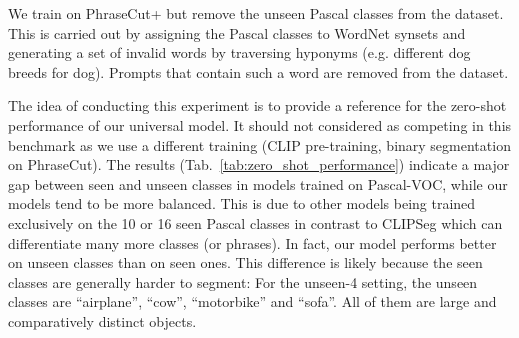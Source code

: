 \documentclass[10pt,twocolumn,letterpaper]{article}
\begin{document}
We train on PhraseCut+ but remove the unseen Pascal classes from the dataset. This is carried out by assigning the Pascal classes to WordNet synsets \cite{wordnet} and generating a set of invalid words by traversing hyponyms (e.g. different dog breeds for dog). Prompts that contain such a word are removed from the dataset.

The idea of conducting this experiment is to provide a reference for the zero-shot performance of our universal model. It should not considered as competing in this benchmark as we use a different training (CLIP pre-training, binary segmentation on PhraseCut).
The results (Tab.~\ref{tab:zero_shot_performance}) indicate a major gap between seen and unseen classes in models trained on Pascal-VOC, while our models tend to be more balanced. This is due to other models being trained exclusively on the 10 or 16 seen Pascal classes in contrast to CLIPSeg which can differentiate many more classes (or phrases). 
In fact, our model performs better on unseen classes than on seen ones. This difference is likely because the seen classes are generally harder to segment: For the unseen-4 setting, the unseen classes are ``airplane'', ``cow'', ``motorbike'' and ``sofa''. All of them are large and comparatively distinct objects.
\end{document}
